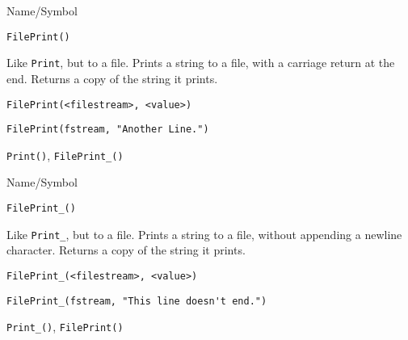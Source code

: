 \begin{desc}{Name/Symbol}
\item[Name/Symbol]	\verb+FilePrint()+

\item[Description]	Like \verb+Print+, but to a file.  Prints a string to a file, 
		with a carriage return at the end.  Returns a
  copy of the string it prints.
	
\item[Usage]
\begin{verbatim}
FilePrint(<filestream>, <value>)
\end{verbatim}

\item[Example]
\begin{verbatim}
FilePrint(fstream, "Another Line.")
\end{verbatim}

\item[See Also]	\verb+Print()+, \verb+FilePrint_()+
\end{desc}



\begin{desc}{Name/Symbol}
\item[Name/Symbol]	\verb+FilePrint_()+

\item[Description]	Like \verb+Print_+, but to a file.  Prints a
  string to a file,	without appending a newline character.  Returns a
  copy of the string it prints.
	
\item[Usage]
\begin{verbatim}
FilePrint_(<filestream>, <value>)
\end{verbatim}

\item[Example]
\begin{verbatim}
FilePrint_(fstream, "This line doesn't end.")
\end{verbatim}

\item[See Also]	\verb+Print_()+, \verb+FilePrint()+
\end{desc}


